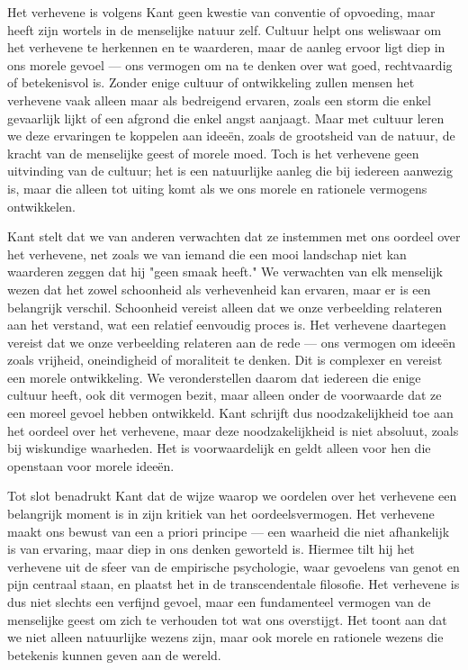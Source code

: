 \begin{mdframed}[leftmargin=0pt,rightmargin=0pt,backgroundcolor=blue!6,linecolor=white,innertopmargin=6pt,innerbottommargin=6pt]
Het verhevene is volgens Kant geen kwestie van conventie of opvoeding, maar heeft zijn wortels in de menselijke natuur zelf. Cultuur helpt ons weliswaar om het verhevene te herkennen en te waarderen, maar de aanleg ervoor ligt diep in ons morele gevoel — ons vermogen om na te denken over wat goed, rechtvaardig of betekenisvol is. Zonder enige cultuur of ontwikkeling zullen mensen het verhevene vaak alleen maar als bedreigend ervaren, zoals een storm die enkel gevaarlijk lijkt of een afgrond die enkel angst aanjaagt. Maar met cultuur leren we deze ervaringen te koppelen aan ideeën, zoals de grootsheid van de natuur, de kracht van de menselijke geest of morele moed. Toch is het verhevene geen uitvinding van de cultuur; het is een natuurlijke aanleg die bij iedereen aanwezig is, maar die alleen tot uiting komt als we ons morele en rationele vermogens ontwikkelen.

Kant stelt dat we van anderen verwachten dat ze instemmen met ons oordeel over het verhevene, net zoals we van iemand die een mooi landschap niet kan waarderen zeggen dat hij "geen smaak heeft." We verwachten van elk menselijk wezen dat het zowel schoonheid als verhevenheid kan ervaren, maar er is een belangrijk verschil. Schoonheid vereist alleen dat we onze verbeelding relateren aan het verstand, wat een relatief eenvoudig proces is. Het verhevene daartegen vereist dat we onze verbeelding relateren aan de rede — ons vermogen om ideeën zoals vrijheid, oneindigheid of moraliteit te denken. Dit is complexer en vereist een morele ontwikkeling. We veronderstellen daarom dat iedereen die enige cultuur heeft, ook dit vermogen bezit, maar alleen onder de voorwaarde dat ze een moreel gevoel hebben ontwikkeld. Kant schrijft dus noodzakelijkheid toe aan het oordeel over het verhevene, maar deze noodzakelijkheid is niet absoluut, zoals bij wiskundige waarheden. Het is voorwaardelijk en geldt alleen voor hen die openstaan voor morele ideeën.

Tot slot benadrukt Kant dat de wijze waarop we oordelen over het verhevene een belangrijk moment is in zijn kritiek van het oordeelsvermogen. Het verhevene maakt ons bewust van een a priori principe — een waarheid die niet afhankelijk is van ervaring, maar diep in ons denken geworteld is. Hiermee tilt hij het verhevene uit de sfeer van de empirische psychologie, waar gevoelens van genot en pijn centraal staan, en plaatst het in de transcendentale filosofie. Het verhevene is dus niet slechts een verfijnd gevoel, maar een fundamenteel vermogen van de menselijke geest om zich te verhouden tot wat ons overstijgt. Het toont aan dat we niet alleen natuurlijke wezens zijn, maar ook morele en rationele wezens die betekenis kunnen geven aan de wereld.


\end{mdframed}
